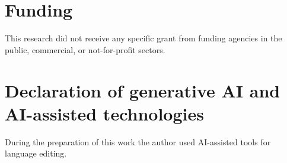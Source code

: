 \documentclass[preprint,12pt]{elsarticle}
\begin{document}
\section*{Funding}
This research did not receive any specific grant from funding agencies in the
public, commercial, or not-for-profit sectors. %

\section*{Declaration of generative AI and AI-assisted technologies}
During the preparation of this work the author used AI-assisted tools for language editing.



\end{document}
